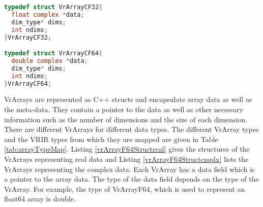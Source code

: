 \begin{lstlisting}[float,language=c, label={vrArrayF64Structcmplx}, caption={Structure of VrArrays for complex data}]
typedef struct VrArrayCF32{
  float complex *data;
  dim_type* dims;  
  int ndims;
}VrArrayCF32;

typedef struct VrArrayCF64{
  double complex *data;
  dim_type* dims;  
  int ndims;
}VrArrayCF64;
\end{lstlisting}
VrArrays are represented as C++ structs and encapsulate array data as well as the meta-data. They contain a pointer to the data as well as other necessary information such as the number of dimensions and the size of each dimension. There are different VrArrays for different data types. The different VrArray types and the VRIR types from which they are mapped are given in Table \ref{tab:arrayTypeMap}. Listing \ref{vrArrayF64Structreal} gives the structures of the VrArrays representing real data and Listing \ref{vrArrayF64Structcmplx} lists the VrArrays representing the complex data. Each VrArray has a data field which is a pointer to the array data. The type of the data field depends on the type of the VrArray. For example, the type of VrArrayF64, which is used to represent an \textsf{float64} array is \textsf{double}. 

